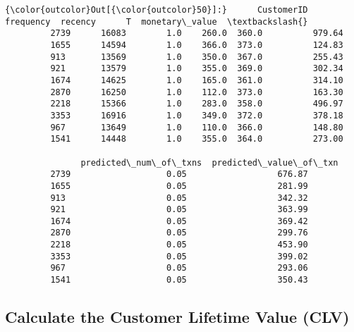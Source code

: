 \documentclass[11pt]{article}
\begin{document}
\begin{Verbatim}[commandchars=\\\{\}]
{\color{outcolor}Out[{\color{outcolor}50}]:}      CustomerID  frequency  recency      T  monetary\_value  \textbackslash{}
         2739      16083        1.0    260.0  360.0          979.64   
         1655      14594        1.0    366.0  373.0          124.83   
         913       13569        1.0    350.0  367.0          255.43   
         921       13579        1.0    355.0  369.0          302.34   
         1674      14625        1.0    165.0  361.0          314.10   
         2870      16250        1.0    112.0  373.0          163.30   
         2218      15366        1.0    283.0  358.0          496.97   
         3353      16916        1.0    349.0  372.0          378.18   
         967       13649        1.0    110.0  366.0          148.80   
         1541      14448        1.0    355.0  364.0          273.00   
         
               predicted\_num\_of\_txns  predicted\_value\_of\_txn  
         2739                   0.05                  676.87  
         1655                   0.05                  281.99  
         913                    0.05                  342.32  
         921                    0.05                  363.99  
         1674                   0.05                  369.42  
         2870                   0.05                  299.76  
         2218                   0.05                  453.90  
         3353                   0.05                  399.02  
         967                    0.05                  293.06  
         1541                   0.05                  350.43  
\end{Verbatim}
            
    \subsection{Calculate the Customer Lifetime Value
(CLV)}\label{calculate-the-customer-lifetime-value-clv}
\end{document}
